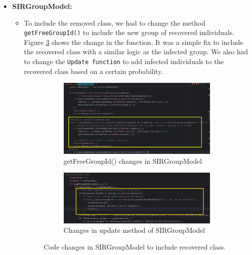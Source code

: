 \begin{itemize}
    \item \textbf{SIRGroupModel:} 
    \begin{itemize}
        \item To include the removed class, we had to change the method \texttt{getFreeGroupId()} to include the new group of recovered individuals. Figure \ref{fig:SIRGroupModel_code_change} shows the change in the function. It was a simple fix to include the recovered class with a similar logic as the infected group. We also had to change the \texttt{Update function} to add infected individuals to the recovered class based on a certain probability. 
        \begin{figure}[h]
            \centering
            \begin{subfigure}[b]{0.5\textwidth}
                 \centering
                 \includegraphics[width=\textwidth]{images/removedClassCode.png}
                \caption{getFreeGroupId() changes in SIRGroupModel}
                \label{task5CodeChangea}
             \end{subfigure}
            \begin{subfigure}[b]{0.5\textwidth}
                 \centering
                 \includegraphics[width=\textwidth]{images/removedClassCOdeChange2.png}
                \caption{Changes in update method of SIRGroupModel}
                \label{fig: task5CodeChangeb}
             \end{subfigure}
            \caption{Code changes in SIRGroupModel to include recovered class.}
            \label{fig:SIRGroupModel_code_change}
        \end{figure}
    \end{itemize}


\end{itemize}
